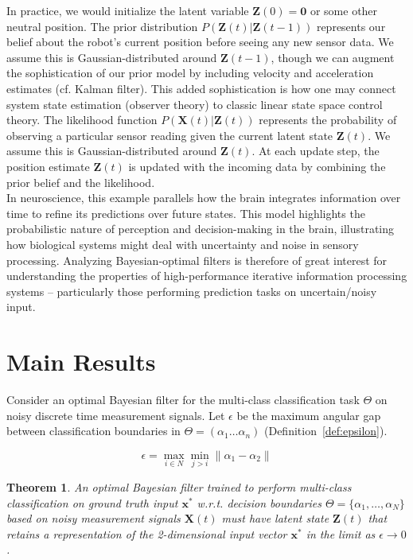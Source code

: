 \documentclass[12pt]{article}
\newtheorem{theorem}{Theorem}
\begin{document}
In practice, we would initialize the latent variable $\mathbf Z(0) = \mathbf 0$ or some other neutral position. 
The prior distribution $P(\mathbf Z(t) | \mathbf Z(t-1))$ represents our belief about the robot's current position before seeing any new sensor data. 
We assume this is Gaussian-distributed around $\mathbf Z(t-1)$, though we can augment the sophistication of our prior model by including velocity and acceleration estimates (cf. Kalman filter). 
This added sophistication is how one may connect system state estimation (observer theory) to classic linear state space control theory. 
The likelihood function $P(\mathbf X(t) | \mathbf Z(t))$ represents the probability of observing a particular sensor reading given the current latent state $\mathbf Z(t)$. 
We assume this is Gaussian-distributed around $\mathbf Z(t)$. 
At each update step, the position estimate $\mathbf Z(t)$ is updated with the incoming data by combining the prior belief and the likelihood. \\ 

In neuroscience, this example parallels how the brain integrates information over time to refine its predictions over future states. 
This model highlights the probabilistic nature of perception and decision-making in the brain, illustrating how biological systems might deal with uncertainty and noise in sensory processing.
Analyzing Bayesian-optimal filters is therefore of great interest for understanding the properties of high-performance iterative information processing systems -- particularly those performing prediction tasks on uncertain/noisy input.


\section{Main Results}
\label{sec:main}

Consider an optimal Bayesian filter for the multi-class classification task
$\Theta$ on noisy discrete time measurement signals. 
Let $\epsilon$ be the maximum angular gap between classification boundaries in $\Theta=(\alpha_1 \dots \alpha_n)$ (Definition~\ref{def:epsilon}).

\begin{equation}
	\label{def:epsilon}
	\epsilon = \max_{i \in N} \min_{j > i} \| \alpha_1 - \alpha_2 \|
\end{equation}

\begin{theorem}
	\label{thm:main}
	An optimal Bayesian filter trained to perform multi-class classification on
	ground truth input $\mathbf x^*$ w.r.t. decision boundaries 
	$\Theta = \{\alpha_1, \dots, \alpha_N\}$ based on noisy measurement signals
	$\mathbf X(t)$ must have latent state $\mathbf Z(t)$ that retains a
	representation of the 2-dimensional input vector $\mathbf x^*$ in the limit 
	as $\epsilon \to 0$. 
\end{theorem}
\end{document}
